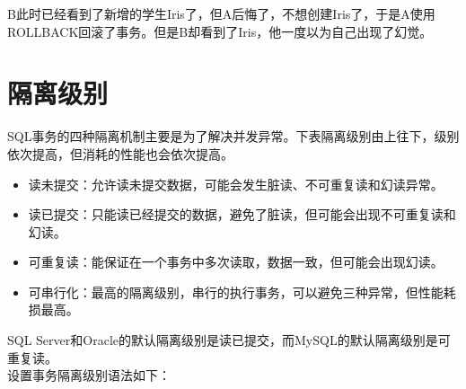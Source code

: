 \documentclass[12pt, openany, oneside]{book}
\begin{document}
B此时已经看到了新增的学生Iris了，但A后悔了，不想创建Iris了，于是A使用ROLLBACK回滚了事务。但是B却看到了Iris，他一度以为自己出现了幻觉。\\

\section{隔离级别}

SQL事务的四种隔离机制主要是为了解决并发异常。下表隔离级别由上往下，级别依次提高，但消耗的性能也会依次提高。

\begin{table}[H]
	\centering
	\caption{隔离级别}
\end{table}

\begin{itemize}
	\item 读未提交：允许读未提交数据，可能会发生脏读、不可重复读和幻读异常。

	\item 读已提交：只能读已经提交的数据，避免了脏读，但可能会出现不可重复读和幻读。

	\item 可重复读：能保证在一个事务中多次读取，数据一致，但可能会出现幻读。

	\item 可串行化：最高的隔离级别，串行的执行事务，可以避免三种异常，但性能耗损最高。
\end{itemize}

SQL Server和Oracle的默认隔离级别是读已提交，而MySQL的默认隔离级别是可重复读。\\

设置事务隔离级别语法如下：

\vspace{-0.5cm}
\end{document}
